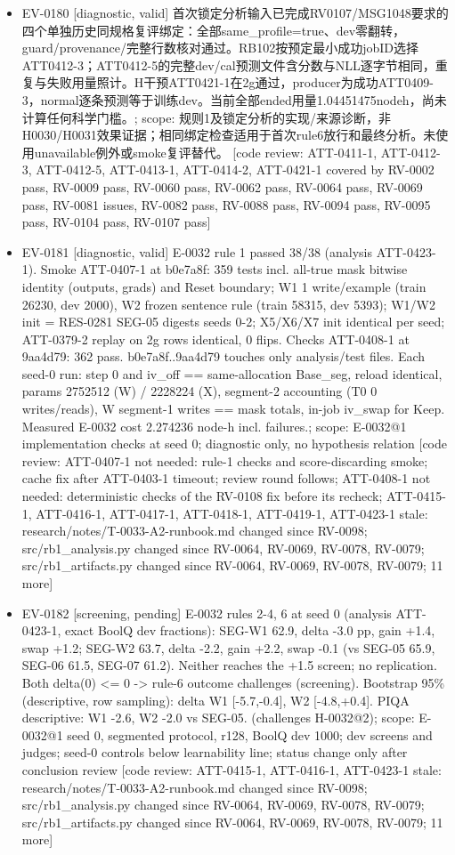 \documentclass[11pt]{article}
\begin{document}
\begin{itemize}
\item EV-0180 [diagnostic, valid] 首次锁定分析输入已完成RV0107/MSG1048要求的四个单独历史同规格复评绑定：全部same\_profile=true、dev零翻转，guard/provenance/完整行数核对通过。RB102按预定最小成功jobID选择ATT0412-3；ATT0412-5的完整dev/cal预测文件含分数与NLL逐字节相同，重复与失败用量照计。H干预ATT0421-1在2g通过，producer为成功ATT0409-3，normal逐条预测等于训练dev。当前全部ended用量1.04451475nodeh，尚未计算任何科学门槛。; scope: 规则1及锁定分析的实现/来源诊断，非H0030/H0031效果证据；相同绑定检查适用于首次rule6放行和最终分析。未使用unavailable例外或smoke复评替代。 [code review: ATT-0411-1, ATT-0412-3, ATT-0412-5, ATT-0413-1, ATT-0414-2, ATT-0421-1 covered by RV-0002 pass, RV-0009 pass, RV-0060 pass, RV-0062 pass, RV-0064 pass, RV-0069 pass, RV-0081 issues, RV-0082 pass, RV-0088 pass, RV-0094 pass, RV-0095 pass, RV-0104 pass, RV-0107 pass]
\item EV-0181 [diagnostic, valid] E-0032 rule 1 passed 38/38 (analysis ATT-0423-1). Smoke ATT-0407-1 at b0e7a8f: 359 tests incl. all-true mask bitwise identity (outputs, grads) and Reset boundary; W1 1 write/example (train 26230, dev 2000), W2 frozen sentence rule (train 58315, dev 5393); W1/W2 init = RES-0281 SEG-05 digests seeds 0-2; X5/X6/X7 init identical per seed; ATT-0379-2 replay on 2g rows identical, 0 flips. Checks ATT-0408-1 at 9aa4d79: 362 pass. b0e7a8f..9aa4d79 touches only analysis/test files. Each seed-0 run: step 0 and iv\_off == same-allocation Base\_seg, reload identical, params 2752512 (W) / 2228224 (X), segment-2 accounting (T0 0 writes/reads), W segment-1 writes == mask totals, in-job iv\_swap for Keep. Measured E-0032 cost 2.274236 node-h incl. failures.; scope: E-0032@1 implementation checks at seed 0; diagnostic only, no hypothesis relation [code review: ATT-0407-1 not needed: rule-1 checks and score-discarding smoke; cache fix after ATT-0403-1 timeout; review round follows; ATT-0408-1 not needed: deterministic checks of the RV-0108 fix before its recheck; ATT-0415-1, ATT-0416-1, ATT-0417-1, ATT-0418-1, ATT-0419-1, ATT-0423-1 stale: research/notes/T-0033-A2-runbook.md changed since RV-0098; src/rb1\_analysis.py changed since RV-0064, RV-0069, RV-0078, RV-0079; src/rb1\_artifacts.py changed since RV-0064, RV-0069, RV-0078, RV-0079; 11 more]
\item EV-0182 [screening, pending] E-0032 rules 2-4, 6 at seed 0 (analysis ATT-0423-1, exact BoolQ dev fractions): SEG-W1 62.9, delta -3.0 pp, gain +1.4, swap +1.2; SEG-W2 63.7, delta -2.2, gain +2.2, swap -0.1 (vs SEG-05 65.9, SEG-06 61.5, SEG-07 61.2). Neither reaches the +1.5 screen; no replication. Both delta(0) \textless{}= 0 -\textgreater{} rule-6 outcome challenges (screening). Bootstrap 95\% (descriptive, row sampling): delta W1 [-5.7,-0.4], W2 [-4.8,+0.4]. PIQA descriptive: W1 -2.6, W2 -2.0 vs SEG-05. (challenges H-0032@2); scope: E-0032@1 seed 0, segmented protocol, r128, BoolQ dev 1000; dev screens and judges; seed-0 controls below learnability line; status change only after conclusion review [code review: ATT-0415-1, ATT-0416-1, ATT-0423-1 stale: research/notes/T-0033-A2-runbook.md changed since RV-0098; src/rb1\_analysis.py changed since RV-0064, RV-0069, RV-0078, RV-0079; src/rb1\_artifacts.py changed since RV-0064, RV-0069, RV-0078, RV-0079; 11 more]

\end{itemize}
\end{document}
